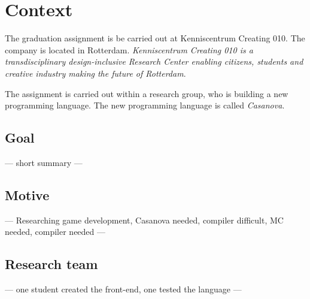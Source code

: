 \section{Context}
The graduation assignment is be carried out at Kenniscentrum Creating 010.
The company is located in Rotterdam.
\textit{Kenniscentrum Creating 010 is a transdisciplinary design-inclusive Research Center enabling citizens, students and creative industry making the future of Rotterdam}\cite{creating2016home}.

The assignment is carried out within a research group, who is building a new programming language.
The new programming language is called \emph{Casanova}.

\subsection{Goal}
--- short summary ---

\subsection{Motive}\label{motive}
--- Researching game development, Casanova needed, compiler difficult, MC needed, compiler needed ---

\subsection{Research team}
--- one student created the front-end, one tested the language ---

